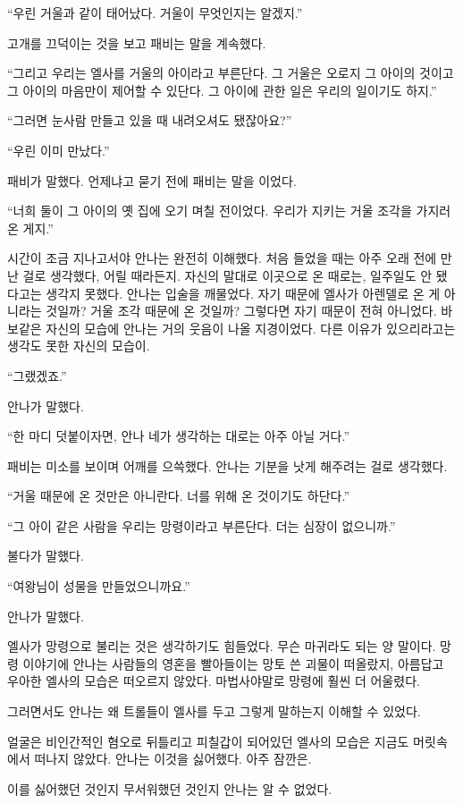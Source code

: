 ``우린 거울과 같이 태어났다. 거울이 무엇인지는 알겠지.''

고개를 끄덕이는 것을 보고 패비는 말을 계속했다.

``그리고 우리는 엘사를 거울의 아이라고 부른단다. 그 거울은 오로지 그 아이의 것이고 그 아이의 마음만이 제어할 수 있단다. 그 아이에 관한 일은 우리의 일이기도 하지.''

``그러면 눈사람 만들고 있을 때 내려오셔도 됐잖아요?''

``우린 이미 만났다.''

패비가 말했다. 언제냐고 묻기 전에 패비는 말을 이었다.

``너희 둘이 그 아이의 옛 집에 오기 며칠 전이었다. 우리가 지키는 거울 조각을 가지러 온 게지.''

시간이 조금 지나고서야 안나는 완전히 이해했다. 처음 들었을 때는 아주 오래 전에 만난 걸로 생각했다, 어릴 때라든지. 자신의 말대로 이곳으로 온 때로는, 일주일도 안 됐다고는 생각지 못했다. 안나는 입술을 깨물었다. 자기 때문에 엘사가 아렌델로 온 게 아니라는 것일까? 거울 조각 때문에 온 것일까? 그렇다면 자기 때문이 전혀 아니었다. 바보같은 자신의 모습에 안나는 거의 웃음이 나올 지경이었다. 다른 이유가 있으리라고는 생각도 못한 자신의 모습이.

``그랬겠죠.''

안나가 말했다.

``한 마디 덧붙이자면, 안나 네가 생각하는 대로는 아주 아닐 거다.''

패비는 미소를 보이며 어깨를 으쓱했다. 안나는 기분을 낫게 해주려는 걸로 생각했다.

``거울 때문에 온 것만은 아니란다. 너를 위해 온 것이기도 하단다.''

``그 아이 같은 사람을 우리는 망령이라고 부른단다. 더는 심장이 없으니까.''

불다가 말했다.

``여왕님이 성물을 만들었으니까요.''

안나가 말했다.

엘사가 망령으로 불리는 것은 생각하기도 힘들었다. 무슨 마귀라도 되는 양 말이다. 망령 이야기에 안나는 사람들의 영혼을 빨아들이는 망토 쓴 괴물이 떠올랐지, 아름답고 우아한 엘사의 모습은 떠오르지 않았다. 마법사야말로 망령에 훨씬 더 어울렸다.

그러면서도 안나는 왜 트롤들이 엘사를 두고 그렇게 말하는지 이해할 수 있었다.

얼굴은 비인간적인 혐오로 뒤틀리고 피칠갑이 되어있던 엘사의 모습은 지금도 머릿속에서 떠나지 않았다. 안나는 이것을 싫어했다. 아주 잠깐은.

이를 싫어했던 것인지 무서워했던 것인지 안나는 알 수 없었다.

